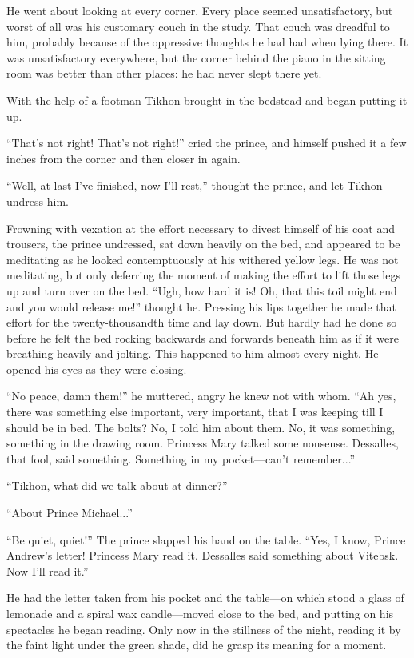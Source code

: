 He went about looking at every corner. Every place seemed
unsatisfactory, but worst of all was his customary couch in the
study.  That couch was dreadful to him, probably because of the
oppressive thoughts he had had when lying there. It was
unsatisfactory everywhere, but the corner behind the piano in the
sitting room was better than other places: he had never slept
there yet.

With the help of a footman Tikhon brought in the bedstead and
began putting it up.

``That's not right! That's not right!'' cried the prince, and
himself pushed it a few inches from the corner and then closer in
again.

``Well, at last I've finished, now I'll rest,'' thought the
prince, and let Tikhon undress him.

Frowning with vexation at the effort necessary to divest himself
of his coat and trousers, the prince undressed, sat down heavily
on the bed, and appeared to be meditating as he looked
contemptuously at his withered yellow legs. He was not
meditating, but only deferring the moment of making the effort to
lift those legs up and turn over on the bed. ``Ugh, how hard it
is! Oh, that this toil might end and you would release me!''
thought he. Pressing his lips together he made that effort for
the twenty-thousandth time and lay down. But hardly had he done
so before he felt the bed rocking backwards and forwards beneath
him as if it were breathing heavily and jolting. This happened to
him almost every night. He opened his eyes as they were closing.

``No peace, damn them!'' he muttered, angry he knew not with
whom. ``Ah yes, there was something else important, very
important, that I was keeping till I should be in bed. The bolts?
No, I told him about them.  No, it was something, something in
the drawing room. Princess Mary talked some nonsense. Dessalles,
that fool, said something. Something in my pocket---can't
remember...''

``Tikhon, what did we talk about at dinner?''

``About Prince Michael...''

``Be quiet, quiet!'' The prince slapped his hand on the
table. ``Yes, I know, Prince Andrew's letter! Princess Mary read
it. Dessalles said something about Vitebsk. Now I'll read it.''

He had the letter taken from his pocket and the table---on which
stood a glass of lemonade and a spiral wax candle---moved close
to the bed, and putting on his spectacles he began reading. Only
now in the stillness of the night, reading it by the faint light
under the green shade, did he grasp its meaning for a moment.

